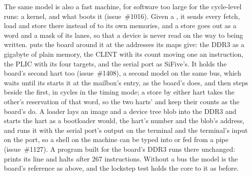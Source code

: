 \documentclass[journal,onecolumn,9pt]{IEEEtran}
\begin{document}
The same model is also a fast machine, for software too large for the
cycle-level runs: a kernel, and what boots it (issue~\#1016). Given a
, it sends every fetch, load and store there instead of to
its own memories, and a store goes out as a word and a mask of its
lanes, so that a device is never read on the way to being written.
 puts the board around it at the
addresses its maps give: the DDR3 as a gigabyte of plain memory, the
CLINT with its count moving one an instruction, the PLIC with its four
targets, and the serial port as SiFive's. It holds the board's second
hart too (issue~\#1408), a second model on the same bus, which waits
until its  starts it at the mailbox's entry, as the board's
 does, and then steps beside the first, in cycles in the
timing mode; a store by either hart takes the other's reservation of
that word, so the two harts'  and  keep their
counts as the board's do. A loader lays an image and
a device tree blob into the DDR3 and starts the hart as a bootloader
would,  the hart's number and  the blob's address,
and  runs it with the serial port's output
on the terminal and the terminal's input on the port, so a shell on the
machine can be typed into or fed from a pipe (issue~\#1127). A program built for the board's DDR3 runs there
unchanged:  prints its line and halts after 267
instructions. Without a bus the model is the board's reference as
above, and the lockstep test holds the core to it as before.
\end{document}
